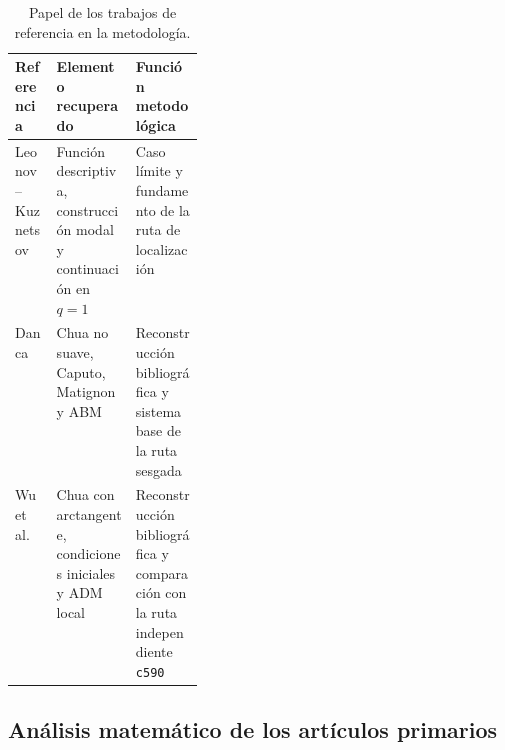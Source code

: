 \begin{table}[H]
\centering
\caption{Papel de los trabajos de referencia en la metodología.}
\label{tab:papel_referencias}
\begin{tabularx}{\linewidth}{L{0.22\linewidth}Y Y}
\toprule
Referencia & Elemento recuperado & Función metodológica\\
\midrule
Leonov--Kuznetsov
& Función descriptiva, construcción modal y continuación en \(q=1\)
& Caso límite y fundamento de la ruta de localización\\
Danca
& Chua no suave, Caputo, Matignon y ABM
& Reconstrucción bibliográfica y sistema base de la ruta sesgada\\
Wu et al.
& Chua con arctangente, condiciones iniciales y ADM local
& Reconstrucción bibliográfica y comparación con la ruta independiente
\texttt{c590}\\
\bottomrule
\end{tabularx}
\end{table}

\subsection{Análisis matemático de los artículos primarios}


